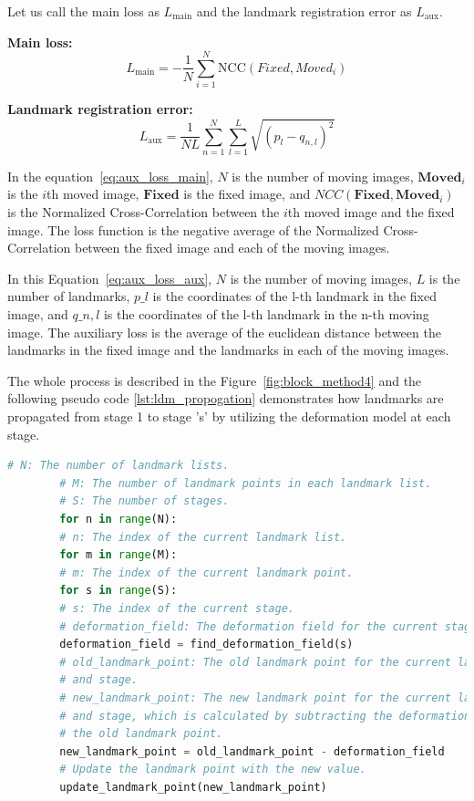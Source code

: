 \documentclass{book}
\begin{document}
	Let us call the main loss as $L_\text{main}$ and the landmark registration error as $L_\text{aux}$.
	
	\textbf{Main loss:}
	\begin{equation}\label{eq:aux_loss_main}
		L_\text{main} = -\frac{1}{N} \sum_{i=1}^N \text{NCC}(Fixed, Moved_i)
	\end{equation}
	
	\textbf{Landmark registration error:}
	\begin{equation}\label{eq:aux_loss_aux}
		L_\text{aux} = \frac{1}{NL} \sum_{n=1}^N \sum_{l=1}^L \sqrt{(p_l - q_{n,l})^2}
	\end{equation}
	
	In the equation~\ref{eq:aux_loss_main}, $N$ is the number of moving images, $\mathbf{Moved}_i$ is the $i$th moved image, $\mathbf{Fixed}$ is the fixed image, and $NCC(\mathbf{Fixed}, \mathbf{Moved}_i)$ is the Normalized Cross-Correlation between the $i$th moved image and the fixed image. The loss function is the negative average of the Normalized Cross-Correlation between the fixed image and each of the moving images.
	
	In this Equation~\ref{eq:aux_loss_aux}, $N$ is the number of moving images, $L$ is the number of landmarks, $p\_l$ is the coordinates of the l-th landmark in the fixed image, and $q\_{n,l}$ is the coordinates of the l-th landmark in the n-th moving image. The auxiliary loss is the average of the euclidean distance between the landmarks in the fixed image and the landmarks in each of the moving images.
	
    The whole process is described in the Figure~\ref{fig:block_method4} and the following pseudo code \ref{lst:ldm_propogation} demonstrates how landmarks are propagated from stage 1 to stage 's' by utilizing the deformation model at each stage.
    
    \begin{lstlisting}[language=Python, label=lst:ldm_propogation, caption=Pseudo code to show how the landmarks are propogated from stage to stage.]
    	# N: The number of landmark lists.
    	# M: The number of landmark points in each landmark list.
    	# S: The number of stages.
    	for n in range(N):
    	# n: The index of the current landmark list.
    	for m in range(M):
    	# m: The index of the current landmark point.
    	for s in range(S):
    	# s: The index of the current stage.
    	# deformation_field: The deformation field for the current stage.
    	deformation_field = find_deformation_field(s)
    	# old_landmark_point: The old landmark point for the current landmark point
    	# and stage.
    	# new_landmark_point: The new landmark point for the current landmark point
    	# and stage, which is calculated by subtracting the deformation field from
    	# the old landmark point.
    	new_landmark_point = old_landmark_point - deformation_field
    	# Update the landmark point with the new value.
    	update_landmark_point(new_landmark_point)
    \end{lstlisting}
\end{document}
